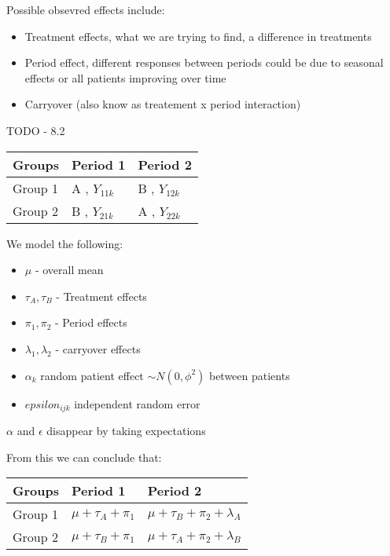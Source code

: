 \documentclass[
  letterpaper,
  DIV=11,
  numbers=noendperiod]{scrreprt}
\providecommand{\tightlist}{%
  \setlength{\itemsep}{0pt}\setlength{\parskip}{0pt}}\usepackage{longtable,booktabs,array}
\begin{document}
Possible obsevred effects include:

\begin{itemize}
\tightlist
\item
  Treatment effects, what we are trying to find, a difference in
  treatments
\item
  Period effect, different responses between periods could be due to
  seasonal effects or all patients improving over time
\item
  Carryover (also know as treatement x period interaction)
\end{itemize}

TODO - 8.2

\begin{longtable}[]{@{}lll@{}}
\toprule()
Groups & Period 1 & Period 2 \\
\midrule()
\endhead
Group 1 & A , \(Y_{11k}\) & B , \(Y_{12k}\) \\
Group 2 & B , \(Y_{21k}\) & A , \(Y_{22k}\) \\
\bottomrule()
\end{longtable}

We model the following:

\begin{itemize}
\tightlist
\item
  \(\mu\) - overall mean
\item
  \(\tau_A , \tau_B\) - Treatment effects
\item
  \(\pi_1, \pi_2\) - Period effects
\item
  \(\lambda_1, \lambda_2\) - carryover effects
\item
  \(\alpha_k\) random patient effect \(\sim N(0, \phi^2)\) between
  patients
\item
  \(epsilon_{ijk}\) independent random error
\end{itemize}

\(\alpha\) and \(\epsilon\) disappear by taking expectations

From this we can conclude that:

\begin{longtable}[]{@{}lll@{}}
\toprule()
Groups & Period 1 & Period 2 \\
\midrule()
\endhead
Group 1 & \(\mu + \tau_A + \pi_1\) &
\(\mu + \tau_B + \pi_2 + \lambda_A\) \\
Group 2 & \(\mu + \tau_B + \pi_1\) &
\(\mu + \tau_A + \pi_2 + \lambda_B\) \\
\bottomrule()
\end{longtable}
\end{document}
